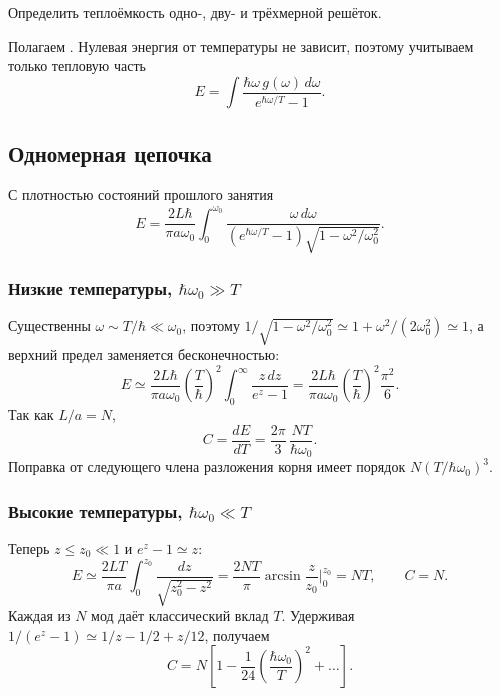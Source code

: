 \documentclass[../final.tex]{subfiles}
\begin{document}
\captionsetup{font=footnotesize,labelfont=bf,skip=5pt}

\begingroup
\renewcommand{\thesection}{4.\arabic{section}}
\label{task:fksv_heat_capacity}

\condition
Определить теплоёмкость одно-, дву- и трёхмерной решёток.

\solution
Полагаем . Нулевая энергия от
температуры не зависит, поэтому учитываем только тепловую часть
\[
    E=\int\frac{\hbar\omega\,g(\omega)\,d\omega}{e^{\hbar\omega/T}-1}.
\]

\subsection*{Одномерная цепочка}

С плотностью состояний прошлого занятия
\[
    E=\frac{2L\hbar}{\pi a\omega_0}\int_0^{\omega_0}
       \frac{\omega\,d\omega}
            {(e^{\hbar\omega/T}-1)\sqrt{1-\omega^2/\omega_0^2}}.
\]

\subsubsection*{Низкие температуры, $\hbar\omega_0\gg T$}
Существенны $\omega\sim T/\hbar\ll\omega_0$, поэтому
$1/\sqrt{1-\omega^2/\omega_0^2}\simeq1+\omega^2/(2\omega_0^2)\simeq1$,
а верхний предел заменяется бесконечностью:
\[
    E\simeq\frac{2L\hbar}{\pi a\omega_0}
       \left(\frac T\hbar\right)^2\int_0^\infty\frac{z\,dz}{e^z-1}
     =\frac{2L\hbar}{\pi a\omega_0}\left(\frac T\hbar\right)^2
       \frac{\pi^2}6.
\]
Так как $L/a=N$,
\[
    C=\frac{dE}{dT}=\frac{2\pi}{3}\,\frac{NT}{\hbar\omega_0}.
\]
Поправка от следующего члена разложения корня имеет порядок
$N(T/\hbar\omega_0)^3$.

\subsubsection*{Высокие температуры, $\hbar\omega_0\ll T$}
Теперь $z\le z_0\ll1$ и $e^z-1\simeq z$:
\[
    E\simeq\frac{2LT}{\pi a}\int_0^{z_0}\frac{dz}{\sqrt{z_0^2-z^2}}
     =\frac{2NT}{\pi}\arcsin\frac z{z_0}\bigg|_0^{z_0}=NT,
    \qquad C=N.
\]
Каждая из $N$ мод даёт классический вклад $T$.
Удерживая $1/(e^z-1)\simeq1/z-1/2+z/12$, получаем
\[
    C=N\left[1-\frac1{24}\left(\frac{\hbar\omega_0}T\right)^2+\ldots\right].
\]
\end{document}
